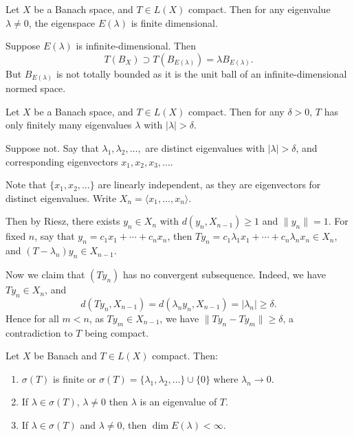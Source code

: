 \documentclass[12pt]{article}
\begin{document}
\begin{proposition}
	Let $X$ be a Banach space, and $T \in L(X)$ compact. Then for any eigenvalue $\lambda \neq 0$, the eigenspace $E(\lambda)$ is finite dimensional.
\end{proposition}

\begin{proofbox}
	Suppose $E(\lambda)$ is infinite-dimensional. Then
	\[
	T(B_X) \supset T(B_{E(\lambda)}) = \lambda B_{E(\lambda)}.
	\]
	But $B_{E(\lambda)}$ is not totally bounded as it is the unit ball of an infinite-dimensional normed space.
\end{proofbox}

\begin{theorem}
	Let $X$ be a Banach space, and $T \in L(X)$ compact. Then for any $\delta > 0$, $T$ has only finitely many eigenvalues $\lambda$ with $|\lambda| > \delta$.
\end{theorem}

\begin{proofbox}
	Suppose not. Say that $\lambda_1, \lambda_2, \ldots,$ are distinct eigenvalues with $|\lambda| > \delta$, and corresponding eigenvectors $x_1, x_2, x_3, \ldots$.

	Note that $\{x_1, x_2, \ldots\}$ are linearly independent, as they are eigenvectors for distinct eigenvalues. Write $X_n = \langle x_1, \ldots, x_n\rangle$.

	Then by Riesz, there exists $y_n \in X_n$ with $d(y_n, X_{n-1}) \geq 1$ and $\|y_n\| = 1$. For fixed $n$, say that $y_n = c_1 x_1 + \cdots + c_n x_n$, then $Ty_n = c_1 \lambda_1 x_1 + \cdots + c_n \lambda_n x_n \in X_n$, and $(T - \lambda_n)y_n \in X_{n-1}$.

	Now we claim that $(Ty_n)$ has no convergent subsequence. Indeed, we have $Ty_n \in X_n$, and
	\[
		d(Ty_n, X_{n-1}) = d(\lambda_n y_n, X_{n-1}) = |\lambda_n| \geq \delta.
	\]
	Hence for all $m < n$, as $Ty_m \in X_{n-1}$, we have $\|Ty_n - Ty_m\| \geq \delta$, a contradiction to $T$ being compact.
\end{proofbox}


\begin{theorem}
	Let $X$ be Banach and $T \in L(X)$ compact. Then:
	\begin{enumerate}[\normalfont(i)]
		\item $\sigma(T)$ is finite or $\sigma(T) = \{\lambda_1, \lambda_2, \ldots\} \cup \{0\}$ where $\lambda_n \to 0$.
		\item If $\lambda \in \sigma(T)$, $\lambda \neq 0$ then $\lambda$ is an eigenvalue of $T$.
		\item If $\lambda \in \sigma(T)$ and $\lambda \neq 0$, then $\dim E(\lambda) < \infty$.
	\end{enumerate}
\end{theorem}
\end{document}
